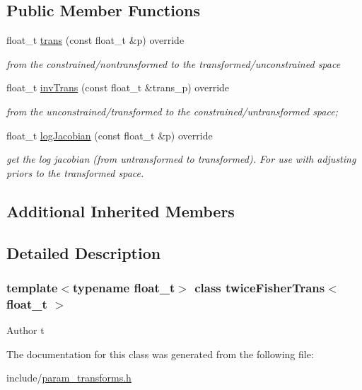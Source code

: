 \subsection*{Public Member Functions}
\begin{DoxyCompactItemize}
\item 
\mbox{\label{classtwiceFisherTrans_a76cce7c83edcc4af90eed6ca367fd77d}} 
float\+\_\+t \hyperlink{classtwiceFisherTrans_a76cce7c83edcc4af90eed6ca367fd77d}{trans} (const float\+\_\+t \&p) override
\begin{DoxyCompactList}\small\item\em from the constrained/nontransformed to the transformed/unconstrained space \end{DoxyCompactList}\item 
\mbox{\label{classtwiceFisherTrans_a5ccfa1b6979a4932a864f9ba557e731d}} 
float\+\_\+t \hyperlink{classtwiceFisherTrans_a5ccfa1b6979a4932a864f9ba557e731d}{inv\+Trans} (const float\+\_\+t \&trans\+\_\+p) override
\begin{DoxyCompactList}\small\item\em from the unconstrained/transformed to the constrained/untransformed space; \end{DoxyCompactList}\item 
\mbox{\label{classtwiceFisherTrans_af384b46c1206793a0457fb52e4024cf4}} 
float\+\_\+t \hyperlink{classtwiceFisherTrans_af384b46c1206793a0457fb52e4024cf4}{log\+Jacobian} (const float\+\_\+t \&p) override
\begin{DoxyCompactList}\small\item\em get the log jacobian (from untransformed to transformed). For use with adjusting priors to the transformed space. \end{DoxyCompactList}\end{DoxyCompactItemize}
\subsection*{Additional Inherited Members}


\subsection{Detailed Description}
\subsubsection*{template$<$typename float\+\_\+t$>$\newline
class twice\+Fisher\+Trans$<$ float\+\_\+t $>$}

\begin{DoxyAuthor}{Author}
t 
\end{DoxyAuthor}


The documentation for this class was generated from the following file\+:\begin{DoxyCompactItemize}
\item 
include/\hyperlink{param__transforms_8h}{param\+\_\+transforms.\+h}\end{DoxyCompactItemize}
